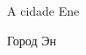 \newpage
\MyriadPro
\begin{center}
\small
A cidade Ene

Город Эн
\end{center}

\scriptsize


%









